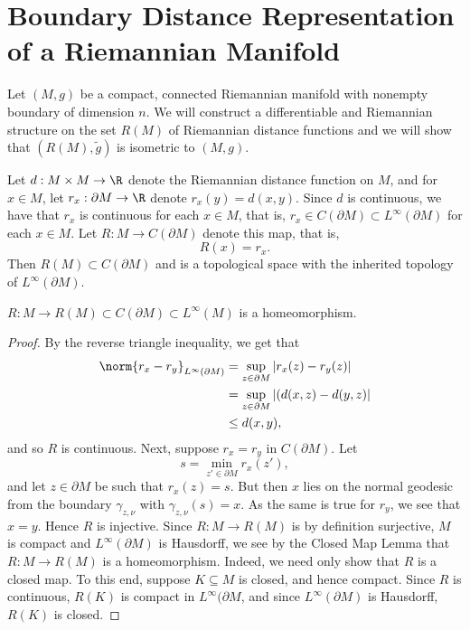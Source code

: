 



\section{Boundary Distance Representation of a Riemannian Manifold}


Let $(M,g)$ be a compact, connected Riemannian manifold with nonempty boundary of dimension $n$.  We will construct a differentiable and Riemannian structure on the set $R(M)$ of Riemannian distance functions and we will show that $(R(M),\tilde{g})$ is isometric to $(M,g)$.

Let $d:M\times M\to\R$ denote the Riemannian distance function on $M$, and for $x\in M$, let $r_x:\partial M\to \R$ denote $r_x(y)=d(x,y)$.  Since $d$ is continuous, we have that $r_x$ is continuous for each $x\in M$, that is, $r_x\in C(\partial M)\subset L^\infty(\partial M)$ for each $x\in M$.  Let $R:M\to C(\partial M)$ denote this map, that is,
$$R(x)=r_x.$$
Then $R(M)\subset C(\partial M)$ and is a topological space with the inherited topology of $L^\infty(\partial M)$.
\begin{lem}
    $R:M\to R(M)\subset C(\partial M)\subset L^\infty(M)$ is a homeomorphism.
\end{lem}

\begin{proof}
By the reverse triangle inequality, we get that
\begin{align*}
	\norm{r_x-r_y}_{L^\infty(\partial M)}&=\sup_{z\in\partial M}|r_x(z)-r_y(z)|\\
	&=\sup_{z\in\partial M}|(d(x,z)-d(y,z)|\\
	&\leq d(x,y),
\end{align*}
and so $R$ is continuous.  Next, suppose $r_x=r_y$ in $C(\partial M)$.  Let
$$s=\min_{z'\in\partial M}r_x(z'),$$
and let $z\in\partial M$ be such that $r_x(z)=s$.  But then $x$ lies on the normal geodesic from the boundary $\gamma_{z,\nu}$ with $\gamma_{z,\nu}(s)=x$.  As the same is true for $r_y$, we see that $x=y$.  Hence $R$ is injective.  Since $R:M\to R(M)$ is by definition surjective, $M$ is compact and $L^\infty(\partial M)$ is Hausdorff, we see by the Closed Map Lemma that $R:M\to R(M)$ is a homeomorphism.  Indeed, we need only show that $R$ is a closed map.  To this end, suppose $K\subseteq M$ is closed, and hence compact.  Since $R$ is continuous, $R(K)$ is compact in $L^\infty(\partial M$, and since $L^\infty(\partial M)$ is Hausdorff, $R(K)$ is closed.
\end{proof}


